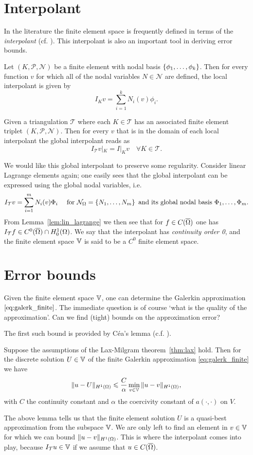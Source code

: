 \documentclass[thesis.tex]{subfiles}
\begin{document}
\section{Interpolant}
\label{sec:apriori}
In the literature the finite element space is frequently defined in terms of the \emph{interpolant} 
(cf. \cite[Ch~3]{brenner}). This interpolant is also an important tool in deriving error bounds. 
  \begin{defn}
    Let $(K, \mathcal{P}, \mathcal{N})$ be a finite element with nodal basis $\set{\phi_1,\dots, \phi_k}$. Then for every function $v$ for which all of the nodal variables $N \in \mathcal{N}$ are defined, the local interpolant is given by
    \[
      I_K v = \sum_{i = 1}^k N_i(v)\phi_i.
    \]
  \end{defn}
  \begin{defn}
    Given a triangulation $\mathcal{T}$ where each $K \in \mathcal{T}$ has an associated 
    finite element triplet $(K, \mathcal{P}, \mathcal{N})$. Then for
    every $v$ that is in the domain of each local interpolant the global interpolant reads as
    \[
      I_{\mathcal{T}} v |_K = I|_K v \quad \forall K \in \mathcal{T}.
    \]
  \end{defn}
  We would like this global interpolant to preserve some regularity. Consider
  linear Lagrange elements again; one easily sees that the global interpolant can be expressed using the global nodal variables, i.e.
    \[
      I_{\mathcal{T}} v = \sum_{i=1}^m N_i(v)\Phi_i \quad \text{ for } \mathcal{N}_\Omega =\set{N_1, \dots, N_m} \text{ and its global nodal basis } \Phi_1,\dots,\Phi_m.
    \]
    From Lemma~\ref{lem:lin_lagrange} we then see that for $f \in C(\overline{\Omega})$ one has $I_{\mathcal{T}} f \in C^0(\overline{\Omega}) \cap H_0^1(\Omega)$. We say
    that the interpolant has \emph{continuity order 0}, and the finite element space $\mathbb{V}$ is said to be a $C^0$ finite element space.
  \section{Error bounds}
  Given the finite element space $\mathbb{V}$, one can determine the Galerkin approximation $\eqref{eq:galerk_finite}$. The immediate
  question is of course `what is the quality of the approximation'. Can we find (tight) bounds
  on the approximation error?

  The first such bound is provided by C\'ea's lemma (c.f. \cite[Thm~2.8.1]{brenner}).
  \begin{lem}
    Suppose the assumptions of the Lax-Milgram theorem~\ref{thm:lax} hold. Then for the discrete solution $U \in \mathbb{V}$ of the
    finite Galerkin approximation \eqref{eq:galerk_finite} we have
    \[
      \| u - U\|_{H^1(\Omega)} \leqslant {C \over \alpha} \min_{v \in \mathbb{V}} \| u - v\|_{H^1(\Omega)},
    \]
    with $C$ the continuity constant and $\alpha$ the coercivity constant of $a(\cdot, \cdot)$ on $V$.
  \end{lem}
  The above lemma tells us that the finite element solution $U$ is a quasi-best approximation from the subspace $\mathbb{V}$. We are
  only left to find an element in $v \in \mathbb{V}$ for which we can bound $\|u - v\|_{H^1(\Omega)}$. This is where the interpolant comes into play, because $I_{\mathcal{T}}u \in \mathbb{V}$ if we assume that $u \in C(\overline{\Omega})$.
\end{document}

